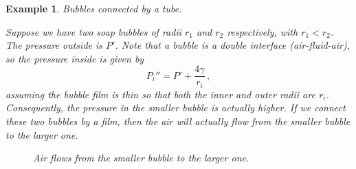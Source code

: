 \documentclass{article}
\theoremstyle{plain}\theoremheaderfont{\normalfont\itshape}\theorembodyfont{\rmfamily}\theoremseparator{.}\newtheorem*{rem}{Remark}\newtheorem*{ex}{Example}\newtheorem*{proof}{Proof}\newtheorem*{altp}{Alternative proof}
\theoremstyle{plain}\theoremheaderfont{\normalfont\bfseries}\theorembodyfont{\rmfamily}\theoremseparator{.}\newtheorem{thm}{Theorem}[section]\newtheorem{lem}[thm]{Lemma}\newtheorem{prop}[thm]{Proposition}\newtheorem*{cor}{Corollary}\newtheorem{defn}[thm]{Definition}\newtheorem{clm}[thm]{Claim}\newtheorem{clminproof}{Claim}\newtheorem*{law}{Law}\newtheorem{pos}[thm]{Postulate}
\theoremstyle{break}\theoremheaderfont{\normalfont\itshape}\theorembodyfont{\rmfamily}\theoremseparator{.\medskip}\newtheorem*{proofskip}{Proof}\newtheorem*{exs}{Examples}\newtheorem*{rems}{Remarks}
\theoremstyle{break}\theoremheaderfont{\normalfont\bfseries}\theorembodyfont{\rmfamily}\theoremseparator{.\medskip}\newtheorem{lemskip}[thm]{Lemma}\newtheorem{defnskip}[thm]{Definition}\newtheorem{propskip}[thm]{Proposition}\newtheorem{thmskip}[thm]{Theorem}
\numberwithin{equation}{section}
\begin{document}
	\begin{ex}
		\textit{Bubbles connected by a tube.}

		Suppose we have two soap bubbles of radii \(r_1\) and \(r_2\) respectively, with \(r_1<r_2\). The pressure outside is \(P'\). Note that a bubble is a double interface (air-fluid-air), so the pressure inside is given by
		\begin{equation}
			P_i''=P'+\frac{4\gamma}{r_i}\,,
		\end{equation}
		assuming the bubble film is thin so that both the inner and outer radii are \(r_i\). Consequently, the pressure in the smaller bubble is actually higher. If we connect these two bubbles by a film, then the air will actually flow from the smaller bubble to the larger one.

		\begin{figure}[ht!]
			\centering
			\caption{Air flows from the smaller bubble to the larger one.}
		\end{figure}
	\end{ex}
\end{document}
